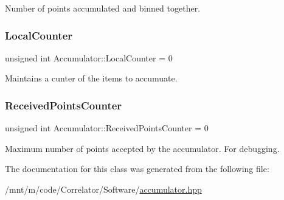 Number of points accumulated and binned together. 

\mbox{\label{classAccumulator_a753e3878c3078a11ee9bc13b6185ec60}} 
\subsubsection{\texorpdfstring{Local\+Counter}{LocalCounter}}
{\footnotesize\ttfamily unsigned int Accumulator\+::\+Local\+Counter = 0\hspace{0.3cm}{\ttfamily [private]}}



Maintains a cunter of the items to accumuate. 

\mbox{\label{classAccumulator_a9cc7c392e99778c99593f7798cb2ab3b}} 
\subsubsection{\texorpdfstring{Received\+Points\+Counter}{ReceivedPointsCounter}}
{\footnotesize\ttfamily unsigned int Accumulator\+::\+Received\+Points\+Counter = 0\hspace{0.3cm}{\ttfamily [private]}}



Maximum number of points accepted by the accumulator. For debugging. 



The documentation for this class was generated from the following file\+:\begin{DoxyCompactItemize}
\item 
/mnt/m/code/\+Correlator/\+Software/\hyperlink{accumulator_8hpp}{accumulator.\+hpp}\end{DoxyCompactItemize}
